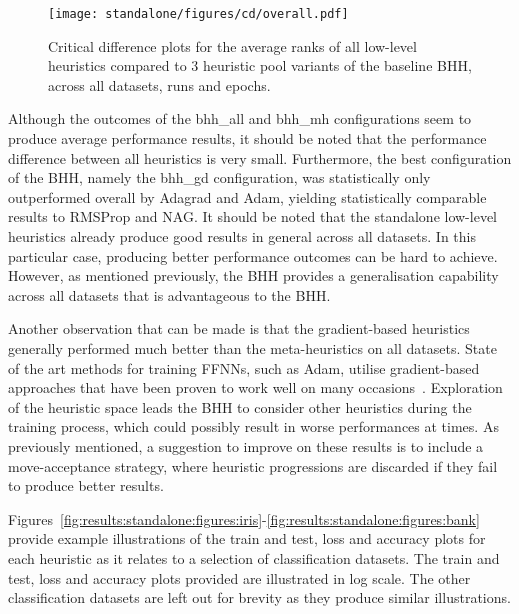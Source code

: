 \begin{figure}[htb]
      \centering
      \texttt{[image: standalone/figures/cd/overall.pdf]}
      \caption{Critical difference plots for the average ranks of all low-level heuristics compared to 3 heuristic pool variants of the baseline \acs{BHH}, across all datasets, runs and epochs.}
      \label{fig:results:standalone:descriptive:cd}
\end{figure}

Although the outcomes of the bhh\_all and bhh\_mh configurations seem to produce average performance results, it should be noted that the performance difference between all heuristics is very small. Furthermore, the best configuration of the \acs{BHH}, namely the bhh\_gd configuration, was statistically only outperformed overall by \acs{Adagrad} and \acs{Adam}, yielding statistically comparable results to \acs{RMSProp} and \acs{NAG}. It should be noted that the standalone low-level  heuristics already produce good results in general across all datasets. In this particular case, producing better performance outcomes can be hard to achieve. However, as mentioned previously, the \acs{BHH} provides a generalisation capability across all datasets that is advantageous to the \acs{BHH}.

Another observation that can be made is that the gradient-based heuristics generally performed much better than the meta-heuristics on all datasets. State of the art methods for training \acp{FFNN}, such as \acs{Adam}, utilise gradient-based approaches that have been proven to work well on many occasions~\cite{ref:kingma:2014}. Exploration of the heuristic space leads the \acs{BHH} to consider other heuristics during the training process, which could possibly result in worse performances at times. As previously mentioned, a suggestion to improve on these results is to include a move-acceptance strategy, where heuristic progressions are discarded if they fail to produce better results.

Figures~\ref{fig:results:standalone:figures:iris}-\ref{fig:results:standalone:figures:bank} provide example illustrations of the train and test, loss and accuracy plots for each heuristic as it relates to a selection of classification datasets. The train and test, loss and accuracy plots provided are illustrated in log scale. The other classification datasets are left out for brevity as they produce similar illustrations.


